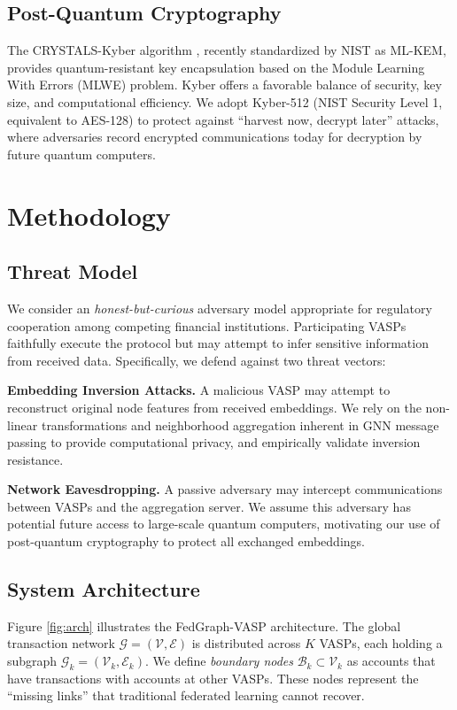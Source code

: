 \documentclass[conference]{IEEEtran}
\begin{document}
\subsection{Post-Quantum Cryptography}
The CRYSTALS-Kyber algorithm \cite{bos2018crystals}, recently standardized by NIST as ML-KEM, provides quantum-resistant key encapsulation based on the Module Learning With Errors (MLWE) problem. Kyber offers a favorable balance of security, key size, and computational efficiency. We adopt Kyber-512 (NIST Security Level 1, equivalent to AES-128) to protect against ``harvest now, decrypt later'' attacks, where adversaries record encrypted communications today for decryption by future quantum computers.

\section{Methodology}

\subsection{Threat Model}
We consider an \textit{honest-but-curious} adversary model appropriate for regulatory cooperation among competing financial institutions. Participating VASPs faithfully execute the protocol but may attempt to infer sensitive information from received data. Specifically, we defend against two threat vectors:

\textbf{Embedding Inversion Attacks.} A malicious VASP may attempt to reconstruct original node features from received embeddings. We rely on the non-linear transformations and neighborhood aggregation inherent in GNN message passing to provide computational privacy, and empirically validate inversion resistance.

\textbf{Network Eavesdropping.} A passive adversary may intercept communications between VASPs and the aggregation server. We assume this adversary has potential future access to large-scale quantum computers, motivating our use of post-quantum cryptography to protect all exchanged embeddings.

\subsection{System Architecture}

Figure \ref{fig:arch} illustrates the FedGraph-VASP architecture. The global transaction network $\mathcal{G} = (\mathcal{V}, \mathcal{E})$ is distributed across $K$ VASPs, each holding a subgraph $\mathcal{G}_k = (\mathcal{V}_k, \mathcal{E}_k)$. We define \textit{boundary nodes} $\mathcal{B}_k \subset \mathcal{V}_k$ as accounts that have transactions with accounts at other VASPs. These nodes represent the ``missing links'' that traditional federated learning cannot recover.
\end{document}
